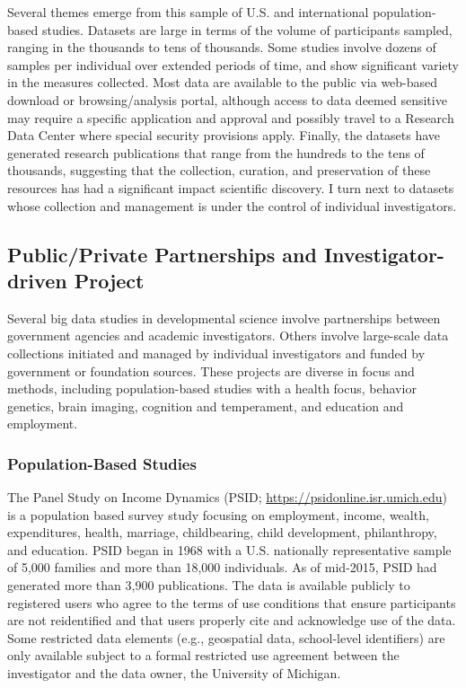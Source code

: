 \documentclass[letterpaper,man,apacite,natbib]{apa6}
\begin{document}
Several themes emerge from this sample of U.S. and international population-based studies.
Datasets are large in terms of the volume of participants sampled, ranging in the thousands to tens of thousands.
Some studies involve dozens of samples per individual over extended periods of time, and show significant variety in the measures collected.
Most data are available to the public via web-based download or browsing/analysis portal, although access to data deemed sensitive may require a specific application and approval and possibly travel to a Research Data Center where special security provisions apply.
Finally, the datasets have generated research publications that range from the hundreds to the tens of thousands, suggesting that the collection, curation, and preservation of these resources has had a significant impact scientific discovery.
I turn next to datasets whose collection and management is under the control of individual investigators.

\subsection{Public/Private Partnerships and Investigator-driven Project}

Several big data studies in developmental science involve partnerships between government agencies and academic investigators.
Others involve large-scale data collections initiated and managed by individual investigators and funded by government or foundation sources.
These projects are diverse in focus and methods, including population-based studies with a health focus, behavior genetics, brain imaging, cognition and temperament, and education and employment.

\subsubsection{Population-Based Studies}

The Panel Study on Income Dynamics (PSID; \url{https://psidonline.isr.umich.edu}) is a population based survey study focusing on employment, income, wealth, expenditures, health, marriage, childbearing, child development, philanthropy, and education.
PSID began in 1968 with a U.S. nationally representative sample of 5,000 families and more than 18,000 individuals.
As of mid-2015, PSID had generated more than 3,900 publications. 
The data is available publicly to registered users who agree to the terms of use conditions that ensure participants are not reidentified and that users properly cite and acknowledge use of the data. 
Some restricted data elements (e.g., geospatial data, school-level identifiers) are only available subject to a formal restricted use agreement between the investigator and the data owner, the University of Michigan.
\end{document}
